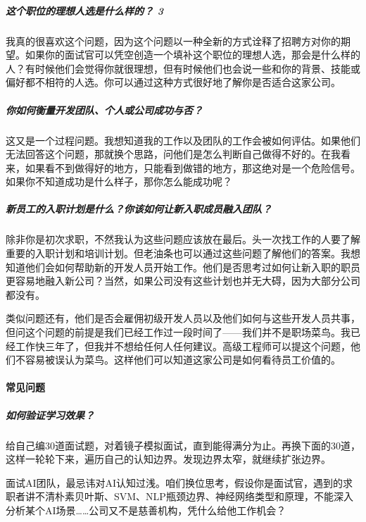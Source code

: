 \documentclass[letterpaper,10pt,english]{sphinxmanual}
\begin{document}
\subparagraph{这个职位的理想人选是什么样的？ 3\sphinxfootnotemark[856]}
\label{\detokenize{chapter_interview/interviewer:id12}}%
\begin{footnotetext}[856]\sphinxAtStartFootnote
{}
%
\end{footnotetext}\ignorespaces 
我真的很喜欢这个问题，因为这个问题以一种全新的方式诠释了招聘方对你的期望。如果你的面试官可以凭空创造一个填补这个职位的理想人选，那会是什么样的人？有时候他们会觉得你就很理想，但有时候他们也会说一些和你的背景、技能或偏好都不相符的人选。你可以通过这种方式很好地了解你是否适合这家公司。


\subparagraph{你如何衡量开发团队、个人或公司成功与否？}
\label{\detokenize{chapter_interview/interviewer:id13}}
这又是一个过程问题。我想知道我的工作以及团队的工作会被如何评估。如果他们无法回答这个问题，那就换个思路，问他们是怎么判断自己做得不好的。在我看来，如果看不到做得好的地方，只能看到做错的地方，那这绝对是一个危险信号。如果你不知道成功是什么样子，那你怎么能成功呢？


\subparagraph{新员工的入职计划是什么？你该如何让新入职成员融入团队？}
\label{\detokenize{chapter_interview/interviewer:id14}}
除非你是初次求职，不然我认为这些问题应该放在最后。头一次找工作的人要了解重要的入职计划和培训计划。但老油条也可以通过这些问题了解他们的答案。我想知道他们会如何帮助新的开发人员开始工作。他们是否思考过如何让新入职的职员更容易地融入新公司？当然，如果公司没有这些计划也并无大碍，因为大部分公司都没有。

类似问题还有，他们是否会雇佣初级开发人员以及他们如何与这些开发人员共事，但问这个问题的前提是我们已经工作过一段时间了——我们并不是职场菜鸟。我已经工作快三年了，但我并不想给任何人任何建议。高级工程师可以提这个问题，他们不容易被误认为菜鸟。这样他们可以知道这家公司是如何看待员工价值的。


\paragraph{常见问题}
\label{\detokenize{chapter_interview/question:id1}}\label{\detokenize{chapter_interview/question::doc}}

\subparagraph{如何验证学习效果？}
\label{\detokenize{chapter_interview/question:id2}}
给自己编30道面试题，对着镜子模拟面试，直到能得满分为止。再换下面的30道，这样一轮轮下来，遍历自己的认知边界。发现边界太窄，就继续扩张边界。

面试AI团队，最忌讳对AI认知过浅。咱们换位思考，假设你是面试官，遇到的求职者讲不清朴素贝叶斯、SVM、NLP瓶颈边界、神经网络类型和原理，不能深入分析某个AI场景……公司又不是慈善机构，凭什么给他工作机会？
\end{document}
